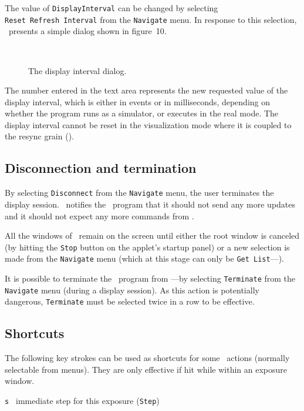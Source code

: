 The value of {\tt DisplayInterval} can be changed by selecting
{\tt Reset~Refresh~Interval} from the {\tt Navigate} menu.
In response to this selection, \dsd\ presents a simple dialog
shown in
figure~10.

\begin{figure}[htbp]%
\begin{center}
\ 
\caption{The display interval dialog.}%
\end{center}
\end{figure}%

The number entered in the text area represents the new requested value of the
display interval, which is either in events or in milliseconds, depending
on whether the program runs as a simulator, or executes in the real mode.
The display interval cannot be reset
in the visualization mode where it is coupled
to the resync grain ().

\subsection{Disconnection and termination}

By selecting {\tt Disconnect} from the {\tt Navigate} menu, the user
terminates the display session.
\dsd\ notifies the \smurph\ program that it should not send any more
updates and it should not expect any more commands from \dsd.

All the windows of \dsd\ remain on the screen until either the root window
is canceled (by hitting the {\tt Stop} button on the applet's startup panel)
or a new selection is made from the {\tt Navigate} menu (which at this
stage can only be {\tt Get~List}---).

It is possible to terminate the \smurph\ program from \dsd---by selecting
{\tt Terminate} from the {\tt Navigate} menu (during a display
session).
As this action is potentially dangerous, {\tt Terminate} must be selected
twice in a row to be effective.

\subsection{Shortcuts}
\label{rm_ds_sh}

The following key strokes can be used as shortcuts for some \dsd\ actions
(normally selectable from menus).
They are only effective if hit while within an exposure window.

\noindent
{\tt s~} immediate step for this exposure ({\tt Step})

